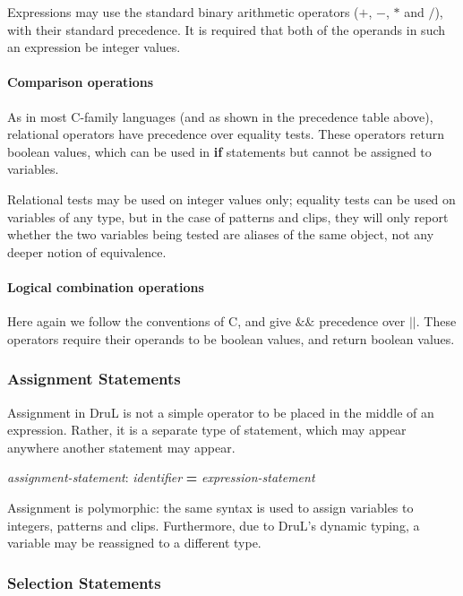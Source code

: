 \documentclass[11pt,twoside]{article}
\begin{document}
Expressions may use the standard binary arithmetic operators ($+$, $-$, $*$ and $/$), with their standard precedence.  It is required that both of the operands in such an expression be integer values.

\paragraph{Comparison operations}

As in most C-family languages (and as shown in the precedence table above), relational operators have precedence over equality tests.  These operators return boolean values, which can be used in \textbf{if} statements but cannot be assigned to variables.

Relational tests may be used on integer values only; equality tests can be used on variables of any type, but in the case of patterns and clips, they will only report whether the two variables being tested are  aliases of the same object, not any deeper notion of equivalence.

\paragraph{Logical combination operations}

Here again we follow the conventions of C, and give $\&\&$ precedence over $||$.  These operators require their operands to be boolean values, and return boolean values.

\subsubsection{Assignment Statements}

Assignment in DruL is not a simple operator to be placed in the middle of an expression.  Rather, it is a separate type of statement, which may appear anywhere another statement may appear.  

\begin{center}
\emph{assignment-statement}: \emph{identifier} \textbf{=}  \emph{expression-statement}
\end{center}

Assignment is polymorphic: the same syntax is used to assign variables to
integers, patterns and clips. Furthermore, due to DruL's dynamic typing,
a variable may be reassigned to a different type.

\subsubsection{Selection Statements}
\end{document}
